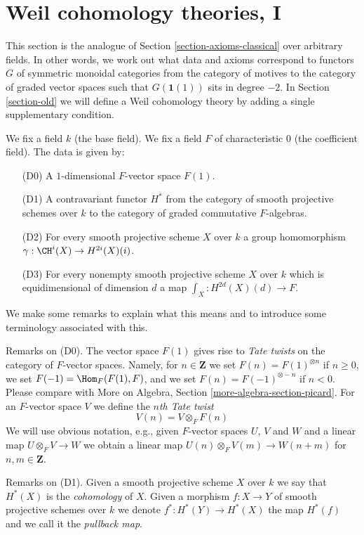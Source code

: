 \section{Weil cohomology theories, I}
\label{section-axioms}

\noindent
This section is the analogue of Section \ref{section-axioms-classical}
over arbitrary fields. In other words, we work out what data and
axioms correspond to functors $G$ of symmetric monoidal categories from
the category of motives to the category of graded vector spaces such that
$G(\mathbf{1}(1))$ sits in degree $-2$. In Section \ref{section-old}
we will define a Weil cohomology theory by adding a single supplementary
condition.

\medskip\noindent
We fix a field $k$ (the base field).
We fix a field $F$ of characteristic $0$ (the coefficient field).
The data is given by:
\begin{enumerate}
\item[(D0)] A $1$-dimensional $F$-vector space $F(1)$.
\item[(D1)] A contravariant functor $H^*$ from the category
of smooth projective schemes over $k$ to the category of
graded commutative $F$-algebras.
\item[(D2)] For every smooth projective scheme $X$ over $k$
a group homomorphism $\gamma : \CH^i(X) \to H^{2i}(X)(i)$.
\item[(D3)] For every nonempty smooth projective scheme $X$ over $k$
which is equidimensional of dimension $d$ a map
$\int_X : H^{2d}(X)(d) \to F$.
\end{enumerate}
We make some remarks to explain what this means and to introduce
some terminology associated with this.

\medskip\noindent
Remarks on (D0).
The vector space $F(1)$ gives rise to {\it Tate twists} on the category of
$F$-vector spaces. Namely, for $n \in \mathbf{Z}$ we set
$F(n) = F(1)^{\otimes n}$ if $n \geq 0$, we set $F(-1) = \Hom_F(F(1), F)$,
and we set $F(n) = F(-1)^{\otimes - n}$ if $n < 0$. Please compare
with More on Algebra, Section \ref{more-algebra-section-picard}.
For an $F$-vector space $V$ we define the {\it $n$th Tate twist}
$$
V(n) = V \otimes_F F(n)
$$
We will use obvious notation, e.g., given $F$-vector spaces $U$, $V$
and $W$ and a linear map $U \otimes_F V \to W$ we obtain a linear
map $U(n) \otimes_F V(m) \to W(n + m)$ for $n, m \in \mathbf{Z}$.

\medskip\noindent
Remarks on (D1).
Given a smooth projective scheme $X$ over $k$ we say that $H^*(X)$
is the {\it cohomology} of $X$. Given a morphism $f : X \to Y$
of smooth projective schemes over $k$ we denote $f^* : H^*(Y) \to H^*(X)$
the map $H^*(f)$ and we call it the {\it pullback map}.

